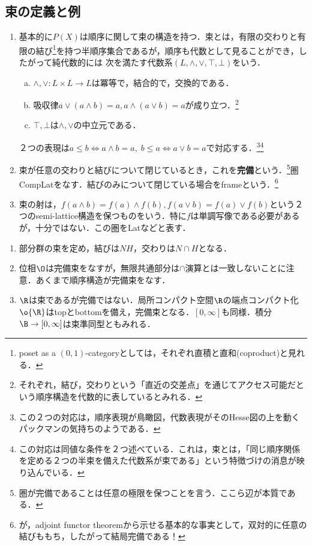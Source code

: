 \documentclass[uplatex, dvipdfmx]{jsreport}
\begin{document}
\subsection{束の定義と例}

\begin{definition}\mbox{}
    \begin{enumerate}
        \item 
    基本的に$P(X)$は順序に関して束の構造を持つ．束とは，有限の交わりと有限の結び\footnote{poset as a $(0,1)$-categoryとしては，それぞれ直積と直和(coproduct)と見れる．}を持つ半順序集合であるが，順序も代数として見ることができ，したがって純代数的には
    次を満たす代数系$(L,\land,\lor,\top,\bot)$をいう．
    \begin{enumerate}[(a)]
        \item $\land,\lor:L\times L\to L$は冪等で，結合的で，交換的である．
        \item 吸収律$a\lor(a\land b)=a,a\land(a\lor b)=a$が成り立つ．\footnote{それぞれ，結び，交わりという「直近の交差点」を通じてアクセス可能だという順序構造を代数的に表しているとみれる．}
        \item $\top,\bot$は$\land,\lor$の中立元である．
    \end{enumerate}
    ２つの表現は$a\le b\Leftrightarrow a\land b=a,\;b\le a\Leftrightarrow a\lor b=a$で対応する．\footnote{この２つの対応は，順序表現が鳥瞰図，代数表現がそのHesse図の上を動くパックマンの気持ちのようである．}\footnote{この対応は同値な条件を２つ述べている．これは，束とは，「同じ順序関係を定める２つの半束を備えた代数系が束である」という特徴づけの消息が映り込んでいる．}
    \item 束が任意の交わりと結びについて閉じているとき，これを\textbf{完備}という．\footnote{圏が完備であることは任意の極限を保つことを言う．ここら辺が本質である．}圏CompLatをなす．結びのみについて閉じている場合をframeという．\footnote{が，adjoint functor theoremから示せる基本的な事実として，双対的に任意の結びももち，したがって結局完備である！}
    \item 束の射は，$f(a\land b)=f(a)\land f(b),f(a\lor b)=f(a)\lor f(b)$という２つのsemi-lattice構造を保つものをいう．特に$f$は単調写像である必要があるが，十分ではない．この圏をLatなどと表す．
    \end{enumerate}
\end{definition}

\begin{example}[束と束準同型の例]\mbox{}\label{exp-lattice}
    \begin{enumerate}
        \item 部分群の束を定め，結びは$NH$，交わりは$N\cap H$となる．
        \item 位相$\O$は完備束をなすが，無限共通部分は$\cap$演算とは一致しないことに注意．あくまで順序構造が完備束をなす．
        \item $\R$は束であるが完備ではない．局所コンパクト空間$\R$の端点コンパクト化$\o{\R}$はtopとbottomを備え，完備束となる．$[0,\infty]$も同様．積分$\B\to[0,\infty]$は束準同型ともみれる．
    \end{enumerate}
\end{example}
\end{document}
